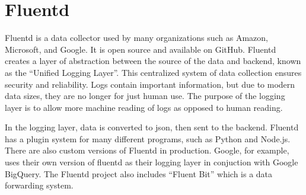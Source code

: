 \section{Fluentd}

Fluentd is a data collector used by many organizations such as Amazon,
Microsoft, and Google\cite{hid-sp18-526-www-fluentd}. It is open source
and available on GitHub. Fluentd creates a layer of abstraction between the
source of the data and backend, known as the ``Unified Logging Layer''. This
centralized system of data collection ensures security and reliability. Logs
contain important information, but due to modern data sizes, they are no
longer for just human use. The purpose of the logging layer is to allow more
machine reading of logs as opposed to human reading.

In the logging layer, data is converted to json, then sent to the
backend. Fluentd has a plugin system for many different programs,
such as Python and Node.js. There are also custom versions of Fluentd in
production. Google, for example, uses their own version of fluentd as their
logging layer in conjuction with Google BigQuery. The Fluentd project also
includes ``Fluent Bit'' which is a data forwarding system.

